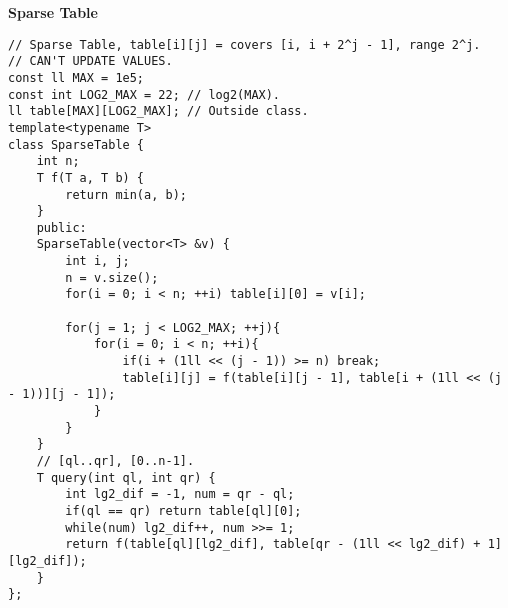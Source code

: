 \documentclass[a4paper,10pt]{article}
\newcommand{\titleAlg}[1]{\vspace{-10pt}
\begin{center}\textbf{#1}\end{center} \vspace{-10pt}}
\begin{document}
\titleAlg{Sparse Table}
\begin{multicols}{2}
\begin{verbatim}
// Sparse Table, table[i][j] = covers [i, i + 2^j - 1], range 2^j.
// CAN'T UPDATE VALUES.
const ll MAX = 1e5;
const int LOG2_MAX = 22; // log2(MAX).
ll table[MAX][LOG2_MAX]; // Outside class.
template<typename T>
class SparseTable {
    int n;
    T f(T a, T b) {
        return min(a, b);
    }
    public:
    SparseTable(vector<T> &v) {
        int i, j;
        n = v.size();
        for(i = 0; i < n; ++i) table[i][0] = v[i];
        
        for(j = 1; j < LOG2_MAX; ++j){
            for(i = 0; i < n; ++i){
                if(i + (1ll << (j - 1)) >= n) break;
                table[i][j] = f(table[i][j - 1], table[i + (1ll << (j - 1))][j - 1]);
            }
        }
    }
    // [ql..qr], [0..n-1].
    T query(int ql, int qr) {
        int lg2_dif = -1, num = qr - ql;
        if(ql == qr) return table[ql][0];
        while(num) lg2_dif++, num >>= 1;
        return f(table[ql][lg2_dif], table[qr - (1ll << lg2_dif) + 1][lg2_dif]);
    }
};
\end{verbatim}
\end{multicols}
\end{document}
